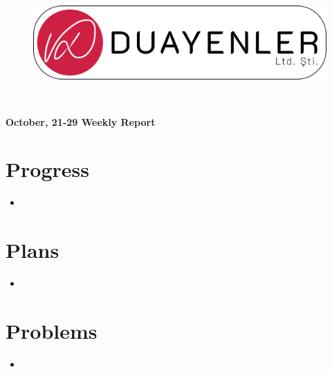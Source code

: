 \documentclass[a4paper,12pt]{article}
\begin{document}
	\begin{minipage}[]{1.0\textwidth}
		\centering
		\begin{figure}[H]
		\center
		\setlength{\unitlength}{\textwidth} 
		\includegraphics[width=0.9\unitlength]{../../../Documents/logos/logo3-with-stroke}
		\end{figure}
	\end{minipage}	\\[0.4cm]
	\begin{minipage}[]{1.0\textwidth}
		\centering
		\Large\textbf{October, 21-29 Weekly Report}
	\end{minipage}

\section{Progress}

\begin{itemize}
	
	\item
	
\end{itemize}


\section{Plans}

\begin{itemize}
	
	\item
	
\end{itemize}


\section{Problems}	

\begin{itemize}
	
	\item
	
\end{itemize}


\end{document}
